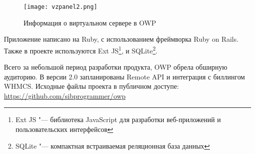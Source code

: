 \begin{figure}[ht]
	\begin{center}
	 	\texttt{[image: vzpanel2.png]}
	 	\caption{Информация о виртуальном сервере в OWP}\label{pic:vzpanel2}
	 \end{center}
\end{figure}

Приложение написано на Ruby, с использованием фреймворка Ruby on Rails. 
Также в проекте используются Ext JS\footnote{Ext JS "--- библиотека JavaScript для разработки веб-приложений и пользовательских интерфейсов}, и SQLite\footnote{SQLite "--- компактная встраиваемая реляционная база данных}. 

Всего за небольшой период разработки продукта, OWP обрела обширную аудиторию.
В версии 2.0 запланированы Remote API и интеграция с биллингом WHMCS.
Исходные файлы проекта в публичном доступе: \url{https://github.com/sibprogrammer/owp}

\iffalse
Proxmox Virtual Environment (Proxmox VE) "--- система виртуализации с открытым исходным кодом, разрабатывается австрийской фирмой Proxmox Server Solutions GmbH.

Proxmox VE, помимо OpenVZ, может использовать KVM. Несколько хостов с Proxmox VE можно объединить в кластер с возможностью <<живой>> миграции гостевых систем, резервным копированием, отказоустойчивостью и прочими полезными функциями.

\begin{figure}[ht]
	\begin{center}
	 	\texttt{[image: proxmox.png]}
	 	\caption{Информация о виртуальном сервере в Proxmox VE}\label{pic:proxmox}
	 \end{center}
\end{figure}
\fi

\clearpage
